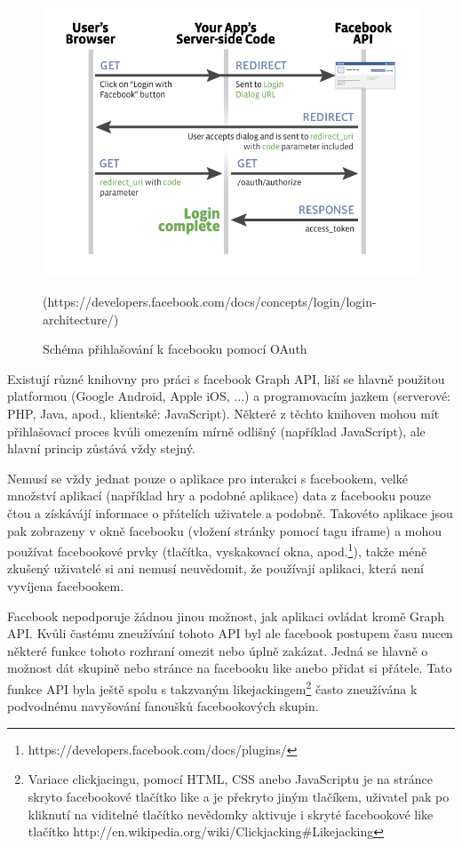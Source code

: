 \documentclass[thesis=M,czech]{FITthesis}[2013/05/10]
\begin{document}
\begin{figure}[h]
\begin{center}
\includegraphics[width=5in]{figures/server-side-diagram.png}
\caption{Schéma přihlašování k facebooku pomocí OAuth}
(https://developers.facebook.com/docs/concepts/login/login-architecture/)
\label{fig:oAuthDiagram}
\end{center}
\end{figure}

Existují různé knihovny pro práci s facebook Graph API, liší se hlavně použitou platformou (Google Android, Apple iOS, ...) a programovacím jazkem (serverové: PHP, Java, apod., klientské: JavaScript). Některé z těchto knihoven mohou mít přihlašovací proces kvůli omezením mírně odlišný (například JavaScript), ale hlavní princip zůstává vždy stejný.

Nemusí se vždy jednat pouze o aplikace pro interakci s facebookem, velké množství aplikací (například hry a podobné aplikace) data z facebooku pouze čtou a získávájí informace o přátelích uživatele a podobně. Takovéto aplikace jsou pak zobrazeny v okně facebooku (vložení stránky pomocí tagu iframe) a mohou používat facebookové prvky (tlačítka, vyskakovací okna, apod.\footnote{https://developers.facebook.com/docs/plugins/}), takže méně zkušený uživatelé si ani nemusí neuvědomit, že používají aplikaci, která není vyvíjena facebookem. 

Facebook nepodporuje žádnou jinou možnost, jak aplikaci ovládat kromě Graph API. Kvůli častému zneužívání tohoto API byl ale facebook postupem času nucen některé funkce tohoto rozhraní omezit nebo úplně zakázat. Jedná se hlavně o možnost dát skupině nebo stránce na facebooku like anebo přidat si přátele. Tato funkce API byla ještě spolu s takzvaným likejackingem\footnote{Variace clickjacingu, pomocí HTML, CSS anebo JavaScriptu je na stránce skryto facebookové tlačítko like a je překryto jiným tlačíkem, uživatel pak po kliknutí na viditelné tlačítko nevědomky aktivuje i skryté facebookové like tlačítko http://en.wikipedia.org/wiki/Clickjacking\#Likejacking} často zneužívána k podvodnému navyšování fanoušků facebookových skupin. 
\end{document}
